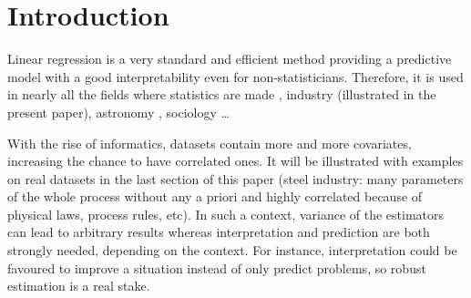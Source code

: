 \documentclass[11pt,a4paper]{article}
\begin{document}
\section{Introduction}
Linear regression is a very standard and efficient method providing a predictive model with a good interpretability even  for non-statisticians. Therefore, it is used in nearly all the fields where statistics are made \cite{montgomery2012introduction},  industry (illustrated in the present paper), astronomy \cite{isobe1990linear}, sociology \cite{longford2012revision} \dots

	With the rise of informatics, datasets contain more and more covariates, %
	increasing the chance to have correlated ones.  It will be illustrated with examples on real datasets in the last section of this paper (steel industry: many parameters of the whole process without any a priori and highly correlated because of physical laws, process rules, etc). 
	 In such a context, variance of the estimators can lead to arbitrary results whereas interpretation and prediction are both strongly needed, depending on the context. For instance, interpretation could be favoured to improve a situation instead of only predict problems, so robust estimation is a real stake.
		~\\	~\\
		
\end{document}

